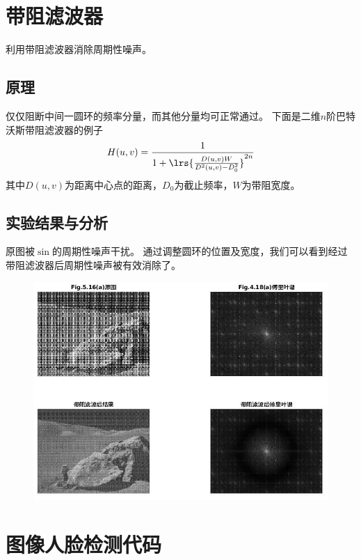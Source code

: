 \documentclass[logo,reportComp]{thesis}
\begin{document}
\section{带阻滤波器}
利用带阻滤波器消除周期性噪声。

\subsection{原理}
仅仅阻断中间一圆环的频率分量，而其他分量均可正常通过。
下面是二维$n$阶巴特沃斯带阻滤波器的例子
\[H(u,v)=\frac{1}{1+\lrs{\frac{D(u,v)W}{D^2(u,v)-D_0^2}}^{2n}}\]
其中$D(u,v)$为距离中心点的距离，$D_0$为截止频率，$W$为带阻宽度。

\subsection{实验结果与分析}
原图被$\sin$的周期性噪声干扰。
通过调整圆环的位置及宽度，我们可以看到经过带阻滤波器后周期性噪声被有效消除了。
\begin{figure}[H]
\centering
\includegraphics[width=\linewidth]{fig/br.jpg}
\end{figure}

\appendix\appendixconfig
\section{图像人脸检测代码}
\begin{lstlisting}

\end{lstlisting}
\end{document}
